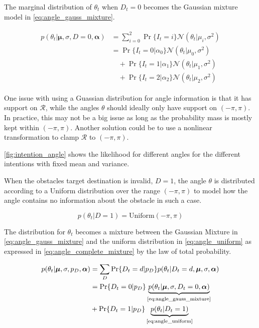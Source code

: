 The marginal distribution of $\theta_t$ when $D_t=0$ becomes the Gaussian mixture model in \cref{eq:angle_gauss_mixture}.

\begin{align}\label{eq:angle_gauss_mixture}
\begin{split}
    p(\theta_t | \boldsymbol{\mu}, \sigma, D=0, \boldsymbol{\alpha}) &= \sum_{i=0}^2 \Pr\{I_t=i\}\mathcal{N}(\theta_t | \mu_i, \sigma^2) \\
    &=\Pr\{I_t=0 | \alpha_0\}\mathcal{N}(\theta_t | \mu_0, \sigma^2)\\
    &\quad+\Pr\{I_t=1 | \alpha_1\}\mathcal{N}(\theta_t | \mu_1, \sigma^2)\\
    &\quad+\Pr\{I_t=2 | \alpha_2\}\mathcal{N}(\theta_t | \mu_2, \sigma^2)
\end{split}
\end{align}

One issue with using a Guassian distribution for angle information is that it has support on $\mathcal{R}$, while the angles $\theta$ should ideally only have support on $(-\pi, \pi)$. In practice, this may not be a big issue as long as the probability mass is mostly kept within $(-\pi, \pi)$. Another solution could be to use a nonlinear transformation to clamp $\mathcal{R}$ to $(-\pi, \pi)$.

\cref{fig:intention_angle} shows the likelihood for different angles for the different intentions with fixed mean and variance. 

When the obstacles target destination is invalid, $D=1$, the angle $\theta$ is distributed according to a Uniform distribution over the range $(-\pi, \pi)$ to model how the angle contains no information about the obstacle in such a case. 

\begin{equation}\label{eq:angle_uniform}
    p(\theta_t | D=1) = \text{Uniform}(-\pi, \pi)
\end{equation}

The distribution for $\theta_t$ becomes a mixture between the Gaussian Mixture in \cref{eq:angle_gauss_mixture} and the uniform distribution in  \cref{eq:angle_uniform} as expressed in \cref{eq:angle_complete_mixture} by the law of total probability.

\begin{align}\label{eq:angle_complete_mixture}
\begin{split}
     p(\theta_t | \boldsymbol{\mu}, \sigma, p_D, \boldsymbol{\alpha})
     &= \sum_D \Pr\{D_t=d | p_D\} p(\theta_t | D_t=d, \boldsymbol{\mu}, \sigma, \boldsymbol{\alpha})\\
     &= \Pr\{D_t = 0 | p_D\} \underbrace{p(\theta_t | \boldsymbol{\mu}, \sigma, D_t=0, \boldsymbol{\alpha})}_{\text{\cref{eq:angle_gauss_mixture}}}\\
     &+ \Pr\{D_t=1 | p_D\}\underbrace{p(\theta_t | D_t=1)}_{\text{\cref{eq:angle_uniform}}}
\end{split}
\end{align}


